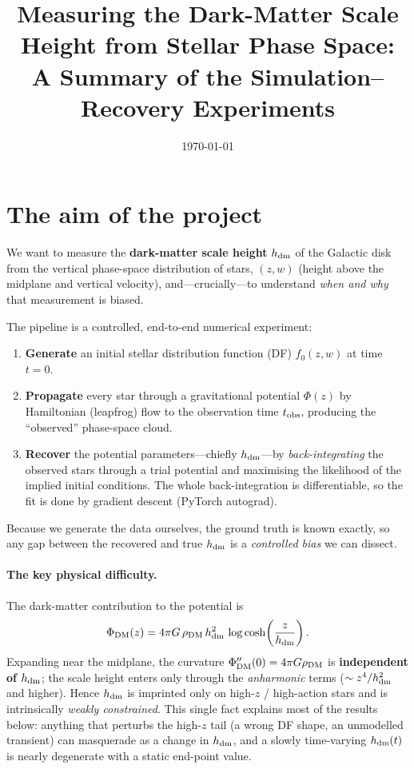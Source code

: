 \documentclass[11pt]{article}
\title{\vspace{-1.5em}Measuring the Dark-Matter Scale Height from Stellar Phase Space:\\
\large A Summary of the Simulation--Recovery Experiments}
\author{}
\date{\today}
\newcommand{\hdm}{h_{\rm dm}}
\newcommand{\Phider}{\Phi}
\begin{document}
\maketitle
\vspace{-3em}

\section{The aim of the project}

We want to measure the \textbf{dark-matter scale height} $\hdm$ of the Galactic
disk from the vertical phase-space distribution of stars, $(z, w)$ (height above
the midplane and vertical velocity), and---crucially---to understand \emph{when
and why} that measurement is biased.

The pipeline is a controlled, end-to-end numerical experiment:
\begin{enumerate}[nosep]
  \item \textbf{Generate} an initial stellar distribution function (DF) $f_0(z,w)$
        at time $t=0$.
  \item \textbf{Propagate} every star through a gravitational potential
        $\Phider(z)$ by Hamiltonian (leapfrog) flow to the observation time
        $t_{\rm obs}$, producing the ``observed'' phase-space cloud.
  \item \textbf{Recover} the potential parameters---chiefly $\hdm$---by
        \emph{back-integrating} the observed stars through a trial potential and
        maximising the likelihood of the implied initial conditions. The whole
        back-integration is differentiable, so the fit is done by gradient
        descent (PyTorch autograd).
\end{enumerate}

Because we generate the data ourselves, the ground truth is known exactly, so any
gap between the recovered and true $\hdm$ is a \emph{controlled bias} we can
dissect.

\paragraph{The key physical difficulty.} The dark-matter contribution to the
potential is
\[
  \Phi_{\rm DM}(z) = 4\pi G\,\rho_{\rm DM}\, \hdm^2\,\log\cosh\!\left(\frac{z}{\hdm}\right).
\]
Expanding near the midplane, the curvature $\Phi_{\rm DM}''(0)=4\pi G\rho_{\rm DM}$
is \textbf{independent of $\hdm$}; the scale height enters only through the
\emph{anharmonic} terms ($\sim z^4/\hdm^2$ and higher). Hence $\hdm$ is imprinted
only on high-$z$ / high-action stars and is intrinsically \emph{weakly
constrained}. This single fact explains most of the results below: anything that
perturbs the high-$z$ tail (a wrong DF shape, an unmodelled transient) can
masquerade as a change in $\hdm$, and a slowly time-varying $\hdm(t)$ is nearly
degenerate with a static end-point value.
\end{document}
